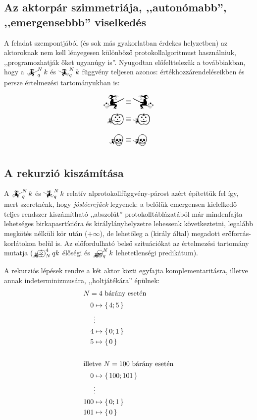 \documentclass{article}
\newcommand{\setOf}[1]{\left\lbrace\,#1\,\right\rbrace}
\newcommand{\mainfunA}[3]{\mathwitch_{#2}^{#1}#3}
\newcommand{\mainfunB}[3]{\reversemathwitch_{#2}^{#1}#3}
\newcommand{\nomainfunA}[3]{{}_{\mathwitch}\!\!\!\!\bigskull^{#1}_{#2}#3}
\newcommand{\nomainfunB}[3]{{}_{\reversemathwitch}\!\!\!\!\bigskull^{#1}_{#2}#3}
\newcommand{\yesmainfunA}[3]{{}_{\mathwitch}\!\!\!\!\bigpumpkin^{#1}_{#2}#3}
\newcommand{\yesmainfunB}[3]{{}_{\reversemathwitch}\!\!\!\!\bigpumpkin^{#1}_{#2}#3}
\newcommand{\currymainfunA}{\mathwitch}
\newcommand{\currymainfunB}{\reversemathwitch}
\begin{document}
	\subsection{Az aktorpár szimmetriája, ,,autonómabb'', ,,emergensebbb'' viselkedés}

	A feladat szempontjából (és sok más gyakorlatban érdekes helyzetben) az aktoroknak nem kell lényegesen különböző protokollalgoritmust használniuk, ,,programozhatják őket ugyanúgy is''.
	Nyugodtan előfelttelezük a továbbiakban, hogy a  $\mainfunA Nqk$ és $\mainfunB Nqk$ függvény teljesen azonos: értékhozzárendeléseikben és persze értelmezési tartományukban is:

	\begin{align}
		\currymainfunA     &\equiv \currymainfunB     \\
		\yesmainfunA{}{}{} &\equiv \yesmainfunB{}{}{} \\
		\nomainfunA{}{}{}  &\equiv \nomainfunB{}{}{}
	\end{align}



	\subsection{A rekurzió kiszámítása}

	A $\mainfunA Nqk$ és $\mainfunB Nqk$ relatív alprotokollfüggvény-párost azért építettük fel így, mert szeretnénk, hogy \emph{jóslóerejűek} legyenek: a belőlük emergensen kielelkedő teljes rendszer kiszámítható ,,abszolút'' protokolltáblázatából már mindenfajta lehetséges birkapasrtícióra és királylányhelyzetre lehessenk következtetni, legalább megkötés nélküli kör után ($+\infty$), de lehetőleg a (király által) megadott erőforrás-korlátokon belül is. Az előfordulható belső szituációkat az értelmezési tartomány mutatja ($\yesmainfunA4 Nqk$ élőségi és $\nomainfunA Nqk$ lehetetlenségi predikátum).

	A rekurziós lépések rendre a két aktor közti egyfajta komplementaritásra, illetve annak indeterminizmusára, ,,holtjátékára'' épülnek:
	\begin{align*}
		\intertext{$N = 4$ bárány esetén}
		0 &\mapsto \setOf{4; 5}\\
		&\vdots\\
		4 &\mapsto \setOf{0; 1}\\
		5 &\mapsto \setOf{0}\\
		\\\intertext{illetve $N = 100$ bárány esetén}
		0 &\mapsto \setOf{100; 101}\\
		&\vdots\\
		100 &\mapsto \setOf{0; 1}\\
		101 &\mapsto \setOf{0}
	\end{align*}
\end{document}
